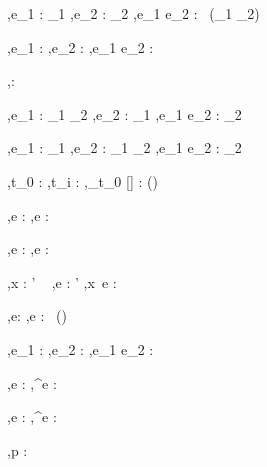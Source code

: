   {\Gamma,\Sigma \infers e_1 : \Task \tau_1 \Quad
   \Gamma,\Sigma \infers e_2 : \Task \tau_2}
  {\Gamma,\Sigma \infers e_1 \Pair e_2 : \Task\ (\tau_1 \times \tau_2)}
  {}

  {\Gamma,\Sigma \infers e_1 : \Task \tau \Quad
   \Gamma,\Sigma \infers e_2 : \Task \tau}
  {\Gamma,\Sigma \infers e_1 \Choose e_2 : \Task \tau}
  {}

  {}
  {\Gamma,\Sigma \infers \Fail : \Task \tau}
  {}


  {\Gamma,\Sigma \infers e_1 : \tau_1 \to \tau_2 \Quad
   \Gamma,\Sigma \infers e_2 : \Task \tau_1}
  {\Gamma,\Sigma \infers e_1 \Trans e_2 : \Task \tau_2}
  {}

  {\Gamma,\Sigma \infers e_1 : \Task \tau_1 \Quad
   \Gamma,\Sigma \infers e_2 : \tau_1 \to \Task \tau_2}
  {\Gamma,\Sigma \infers e_1 \Step e_2 : \Task \tau_2}
  {}

  {\Gamma,\Sigma \infers t_0 : \Task \tau \Quad
    \quad
   \Gamma,\Sigma \infers t_i : \Task \tau}
  {\Gamma,\Sigma \infers \Pool_{t_0} [] : \Task (\List \tau)}
  {}

  {\Gamma,\Sigma \infers e : \Task \tau}
  {\Gamma,\Sigma \infers \Repeat e : \Task \tau}
  {}

  {\Gamma,\Sigma \infers e : \Bool}
  {\Gamma,\Sigma \infers \Assert e : \Task \Bool}
  {}

  {\Gamma,\Sigma \infers x : \tau' \to \Task\ \tau \Quad
   \Gamma,\Sigma \infers e : \tau'}
  {\Gamma,\Sigma \infers x\ e : \Task\ \tau}
  {}

  {\Gamma,\Sigma \infers e: \beta}
  {\Gamma,\Sigma \infers \Share e : \Task\ (\Reference \beta)}
  {}

  {\Gamma,\Sigma \infers e_1 : \Reference \beta \Quad
   \Gamma,\Sigma \infers e_2 : \beta}
  {\Gamma,\Sigma \infers e_1 \Assign e_2 : \Task \Unit}
  {}

  {\Gamma,\Sigma \infers e : \Reference \beta}
  {\Gamma,\Sigma \infers \Change^\nu e : \Task \beta}
  {}

  {\Gamma,\Sigma \infers e : \Reference \beta}
  {\Gamma,\Sigma \infers \Watch^\nu e : \Task \beta}
  {}



  {\Gamma,\Sigma \infers p : \shaded{\Task\ \rho}}

